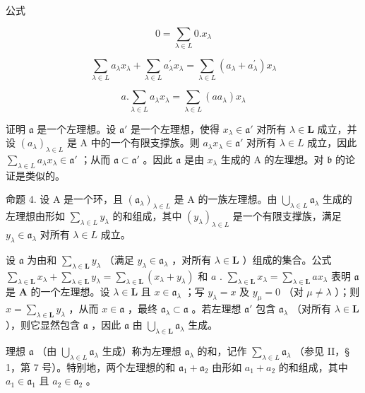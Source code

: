 公式

\[
0 = \sum_ {\lambda \in L} 0. x _ {\lambda}\tag{18}
\]

\[
\sum_ {\lambda \in L} a _ {\lambda} x _ {\lambda} + \sum_ {\lambda \in L} a _ {\lambda} ^ {\prime} x _ {\lambda} = \sum_ {\lambda \in L} (a _ {\lambda} + a _ {\lambda} ^ {\prime}) x _ {\lambda}\tag{19}
\]

\[
a. \sum_ {\lambda \in L} a _ {\lambda} x _ {\lambda} = \sum_ {\lambda \in L} (a a _ {\lambda}) x _ {\lambda}\tag{20}
\]

证明 \(\mathfrak{a}\) 是一个左理想。设 \(\mathfrak{a}'\) 是一个左理想，使得 \(x_{\lambda} \in \mathfrak{a}'\) 对所有 \(\lambda \in \mathbf{L}\) 成立，并设 \((a_{\lambda})_{\lambda \in L}\) 是 A 中的一个有限支撑族。则 \(a_{\lambda}x_{\lambda}\in \mathfrak{a}'\) 对所有 \(\lambda \in L\) 成立，因此 \(\sum_{\lambda \in L}a_{\lambda}x_{\lambda}\in \mathfrak{a}'\) ；从而 \(\mathfrak{a}\subset \mathfrak{a}'\) 。因此 \(\mathfrak{a}\) 是由 \(x_{\lambda}\) 生成的 A 的左理想。对 \(\mathfrak{b}\) 的论证是类似的。

命题 4. 设 A 是一个环，且 \((\mathfrak{a}_{\lambda})_{\lambda \in L}\) 是 A 的一族左理想。由 \(\bigcup_{\lambda \in L} \mathfrak{a}_{\lambda}\) 生成的左理想由形如 \(\sum_{\lambda \in L} y_{\lambda}\) 的和组成，其中 \((y_{\lambda})_{\lambda \in L}\) 是一个有限支撑族，满足 \(y_{\lambda} \in \mathfrak{a}_{\lambda}\) 对所有 \(\lambda \in L\) 成立。

设 \(\mathfrak{a}\) 为由和 \(\sum_{\lambda \in \mathbf{L}} y_{\lambda}\) （满足 \(y_{\lambda} \in \mathfrak{a}_{\lambda}\) ，对所有 \(\lambda \in \mathbf{L}\) ）组成的集合。公式 \(\sum_{\lambda \in \mathbf{L}} x_{\lambda} + \sum_{\lambda \in \mathbf{L}} y_{\lambda} = \sum_{\lambda \in \mathbf{L}} (x_{\lambda} + y_{\lambda})\) 和 \(a\) . \(\sum_{\lambda \in \mathbf{L}} x_{\lambda} = \sum_{\lambda \in \mathbf{L}} ax_{\lambda}\) 表明 \(\mathfrak{a}\) 是 \(\mathbf{A}\) 的一个左理想。设 \(\lambda \in \mathbf{L}\) 且 \(x \in \mathfrak{a}_{\lambda}\) ；写 \(y_{\lambda} = x\) 及 \(y_{\mu} = 0\) （对 \(\mu \neq \lambda\) ）；则 \(x = \sum_{\lambda \in \mathbf{L}} y_{\lambda}\) ，从而 \(x \in \mathfrak{a}\) ，最终 \(\mathfrak{a}_{\lambda} \subset \mathfrak{a}\) 。若左理想 \(\mathfrak{a}'\) 包含 \(\mathfrak{a}_{\lambda}\) （对所有 \(\lambda \in \mathbf{L}\) ），则它显然包含 \(\mathfrak{a}\) ，因此 \(\mathfrak{a}\) 由 \(\bigcup_{\lambda \in \mathbf{L}} \mathfrak{a}_{\lambda}\) 生成。

理想 \(\mathfrak{a}\) （由 \(\bigcup_{\lambda \in L} \mathfrak{a}_{\lambda}\) 生成）称为左理想 \(\mathfrak{a}_{\lambda}\) 的和，记作 \(\sum_{\lambda \in L} \mathfrak{a}_{\lambda}\) （参见 II，§ 1，第 7 号）。特别地，两个左理想的和 \(\mathfrak{a}_{1} + \mathfrak{a}_{2}\) 由形如 \(a_{1} + a_{2}\) 的和组成，其中 \(a_{1} \in \mathfrak{a}_{1}\) 且 \(a_{2} \in \mathfrak{a}_{2}\) 。

